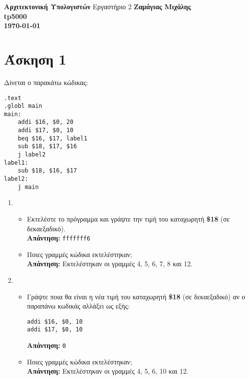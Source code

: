 \documentclass[a4paper,12pt]{article}
\begin{document}
\begin{titlepage}
    \begin{center}
        \vspace*{\fill}
        \huge{\textbf{Αρχιτεκτονική Υπολογιστών}}
        \vfill
        Εργαστήριο 2
        \vfill
        \vspace*{\fill}
        \vfill
        \normalsize\textbf{Ζαμάγιας Μιχάλης\\tp5000\\}
        \small\textbf{\today}
        \vfill
    \end{center}
\end{titlepage}



\section*{Άσκηση 1}
Δίνεται ο παρακάτω κώδικας:
\begin{lstlisting}
.text
.globl main
main:
    addi $16, $0, 20
    addi $17, $0, 10
    beq $16, $17, label1
    sub $18, $17, $16
    j label2
label1:
    sub $18, $16, $17
label2:
    j main
\end{lstlisting}

\begin{enumerate}
    \item \begin{itemize}
              \item Εκτελέστε το πρόγραμμα και γράψτε την τιμή του
                    καταχωρητή \textbf{\$18} (σε δεκαεξαδικό).\\
                    \textbf{Απάντηση:} \texttt{fffffff6}
              \item Ποιες γραμμές κώδικα εκτελέστηκαν;\\
                    \textbf{Απάντηση:} Eκτελέστηκαν οι γραμμές 4, 5, 6, 7, 8 και 12.
          \end{itemize}
    \item \begin{itemize}
              \item Γράψτε ποια θα είναι η νέα τιμή του καταχωρητή \textbf{\$18} (σε δεκαεξαδικό) αν ο παραπάνω κωδικάς αλλάξει ως εξής:
                    \begin{lstlisting}[firstnumber=4]
addi $16, $0, 10
addi $17, $0, 10
\end{lstlisting}
                    \textbf{Απάντηση:} \texttt{0}
              \item Ποιες γραμμές κώδικα εκτελέστηκαν;\\
                    \textbf{Απάντηση:} Eκτελέστηκαν οι γραμμές 4, 5, 6, 10 και 12.
          \end{itemize}
\end{enumerate}
\end{document}
